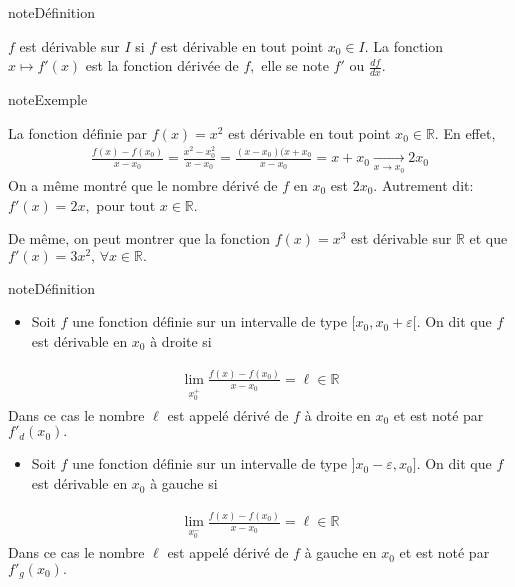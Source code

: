 \documentclass[letterpaper,10pt,french]{jupyterBook}
\begin{document}
\begin{sphinxadmonition}{note}{Définition}

\sphinxAtStartPar
\(f\) est dérivable sur \(I\) si \(f\) est dérivable en tout point \(x_0\in I.\) La fonction \(x\mapsto f'(x)\) est la fonction dérivée de \(f,\) elle se note \(f'\) ou \(\frac{df}{dx}.\)
\end{sphinxadmonition}

\begin{sphinxadmonition}{note}{Exemple}

\sphinxAtStartPar
La fonction définie par \(f(x)=x^2\) est dérivable en tout point \(x_0\in \mathbb{R}.\) En effet,
\begin{equation*}
\begin{split}
\frac{f(x)-f(x_0)}{x-x_0}=\frac{x^2-x_{0}^{2}}{x-x_0}=\frac{(x-x_0)(x+x_0}{x-x_0}=x+x_0\underset{x\to x_0}{\longrightarrow}2x_0
\end{split}
\end{equation*}
\sphinxAtStartPar
On a même montré que le nombre dérivé de \(f\) en \(x_0\) est \(2x_0.\) Autrement dit: \(f'(x)=2x,\) pour tout \(x\in \mathbb{R}.\)
\end{sphinxadmonition}

\sphinxAtStartPar
De même, on peut montrer que la fonction \(f(x)=x^3\) est dérivable sur \(\mathbb{R}\) et que \(f'(x)=3x^2,\,\forall x\in \mathbb{R}.\)

\begin{sphinxadmonition}{note}{Définition}
\begin{itemize}
\item {} 
\sphinxAtStartPar
Soit \(f\) une fonction définie sur un intervalle de type \([x_0,x_0+\varepsilon[.\) On dit que \(f\) est dérivable en \(x_0\) à droite si

\end{itemize}
\begin{equation*}
\begin{split}
\lim\limits_{\substack{x_{0}^{+}}}\frac{f(x)-f(x_0)}{x-x_0}=\ell\in \mathbb{R}
\end{split}
\end{equation*}
\sphinxAtStartPar
Dans ce cas le nombre \(\ell\) est appelé dérivé de \(f\) à droite en \(x_0\) et est noté par \(f'_d (x_0).\)
\begin{itemize}
\item {} 
\sphinxAtStartPar
Soit \(f\) une fonction définie sur un intervalle de type \(]x_0-\varepsilon,x_0].\) On dit que \(f\) est dérivable en \(x_0\) à gauche si

\end{itemize}
\begin{equation*}
\begin{split}
\lim\limits_{\substack{x_{0}^{-}}}\frac{f(x)-f(x_0)}{x-x_0}=\ell\in \mathbb{R}
\end{split}
\end{equation*}
\sphinxAtStartPar
Dans ce cas le nombre \(\ell\) est appelé dérivé de \(f\) à gauche en \(x_0\) et est noté par \(f'_g (x_0).\)
\end{sphinxadmonition}
\end{document}
